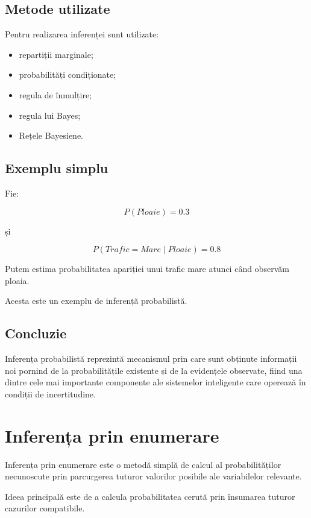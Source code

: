\documentclass[12pt,a4paper]{article}
\begin{document}
\subsection{Metode utilizate}

Pentru realizarea inferenței sunt utilizate:

\begin{itemize}
\item repartiții marginale;
\item probabilități condiționate;
\item regula de înmulțire;
\item regula lui Bayes;
\item Rețele Bayesiene.
\end{itemize}

\subsection{Exemplu simplu}

Fie:

\[
P(Ploaie)=0.3
\]

și

\[
P(Trafic=Mare \mid Ploaie)=0.8
\]

Putem estima probabilitatea apariției unui trafic mare atunci când observăm ploaia.

Acesta este un exemplu de inferență probabilistă.

\subsection{Concluzie}

Inferența probabilistă reprezintă mecanismul prin care sunt obținute informații noi pornind de la probabilitățile existente și de la evidențele observate, fiind una dintre cele mai importante componente ale sistemelor inteligente care operează în condiții de incertitudine.





\section{Inferența prin enumerare}

Inferența prin enumerare este o metodă simplă de calcul al probabilităților necunoscute prin parcurgerea tuturor valorilor posibile ale variabilelor relevante.

Ideea principală este de a calcula probabilitatea cerută prin însumarea tuturor cazurilor compatibile.
\end{document}
